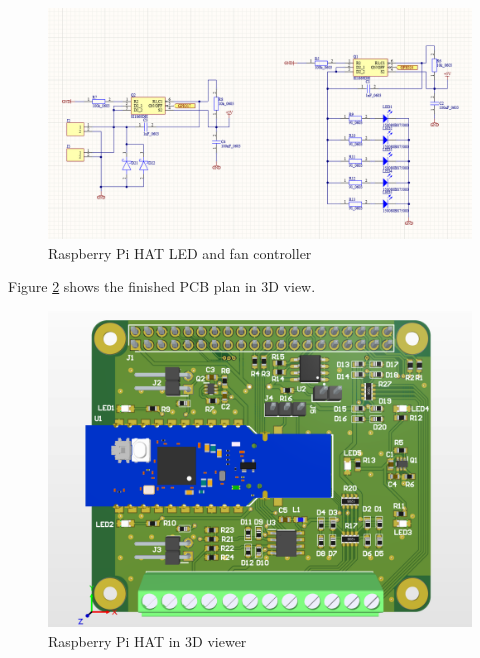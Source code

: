\begin{figure}[!htb]
    \centering
    \includegraphics[width=\textwidth]{img/ickrpihat.png}
    \caption{Raspberry Pi HAT LED and fan controller}
    \label{fig:borderventiled}
\end{figure}
\newline
Figure \ref{fig:3drpi} shows the finished PCB plan in 3D view.
\begin{figure}[!htb]
    \centering
    \includegraphics[width=\textwidth]{img/rpi3d.png}
    \caption{Raspberry Pi HAT in 3D viewer}
    \label{fig:3drpi}
\end{figure}


